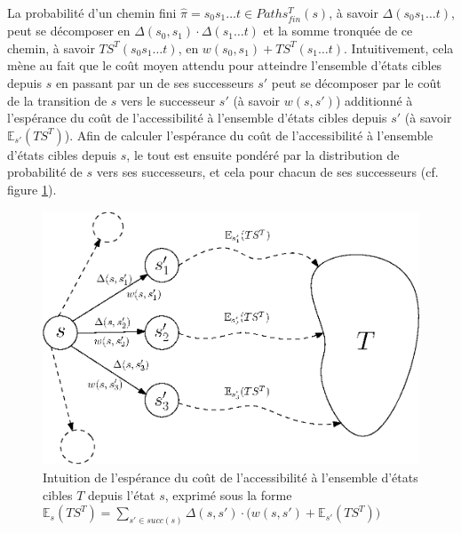 \documentclass[12pt,a4paper]{report}
\theoremstyle{definition}%
\theoremstyle{remark}
\newcommand{\cf}{cf. }
\begin{document}
La probabilité d'un chemin fini $\hat{\pi} = s_0 s_1 \dots t \in Paths_{fin}^T(s)$, à savoir $\Delta(s_0 s_1 \dots t)$, peut se décomposer en $\Delta(s_0, s_1) \cdot \Delta(s_1 \dots t)$ et la somme tronquée de ce chemin, à savoir $TS^T(s_0 s_1 \dots t)$, en $w(s_0, s_1) + TS^T(s_1 \dots t)$. Intuitivement, cela mène au fait   que le coût moyen attendu pour atteindre l'ensemble d'états cibles depuis $s$ en passant par un de ses successeurs $s'$ peut se décomposer par le coût de la transition de $s$ vers le successeur $s'$ (à savoir $w(s, s')$) additionné à l'espérance du coût de l'accessibilité à l'ensemble d'états cibles depuis $s'$ (à savoir $\mathbb{E}_{s'}(TS^T)$). Afin de calculer l'espérance du coût de l'accessibilité à l'ensemble d'états cibles depuis $s$, le tout est ensuite pondéré par la distribution de probabilité de $s$ vers ses successeurs, et cela pour chacun de ses successeurs (\cf figure \ref{intuitionES}).

	\begin{figure}[H]
	\centering
	\captionsetup{justification=centering}
	\includegraphics[scale=0.75]{figures/intuitionES.eps}
	\caption{Intuition de l'espérance du coût de l'accessibilité à l'ensemble d'états cibles $T$ depuis l'état $s$, exprimé sous la forme $\mathbb{E}_s(TS^T) = \sum_{s' \in succ(s)} \Delta(s, s') \cdot \big( w(s, s') + \mathbb{E}_{s'}(TS^T) \big)$}
	\label{intuitionES}
\end{figure}
\end{document}
